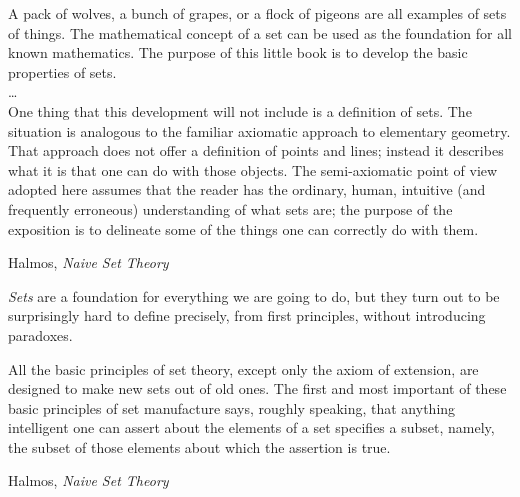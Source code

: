 \setcounter{currentlevel}{\value{baseSectionLevel}}
\epigraph{A pack of wolves, a bunch of grapes, or a flock of
pigeons are all examples of sets of things.
The mathematical concept of a set can be used as the foundation
for all known mathematics.
The purpose of this little book is to develop the basic properties
of sets.\\
\ldots \\
One thing that this development will not include is a definition
of sets.
The situation is analogous to the familiar axiomatic approach to
elementary geometry.
That approach does not offer a definition of points and lines;
instead it describes what it is that one can do with those
objects.
The semi-axiomatic point of view adopted here assumes that the
reader has the ordinary, human, intuitive (and frequently
erroneous) understanding of what sets are; the purpose of the
exposition is to delineate some of the things one can correctly do
with them.}%
{Halmos, \textit{Naive Set Theory}\cite{Halmos1960Naive}}

\vfill

\emph{Sets} are a foundation for everything we are going to do,
but they turn out to be surprisingly hard to define precisely,
from first principles, without introducing paradoxes.

\vfill

\label{sec:math-sets}
\lstset{language=Clojure}

\cite{Ferreiros:2007:Labyrinth,sep:DedekindFoundations}

\epigraph{All the basic principles of set theory, except only the
axiom of extension, are designed to make new sets out of old ones.
The first and most important of these basic principles of set
manufacture says, roughly speaking, that anything intelligent one
can assert about the elements of a set specifies a subset, namely,
the subset of those elements about which the assertion is true.}
{Halmos, \textit{Naive Set Theory}~\cite[section~2]{Halmos1960Naive}}

